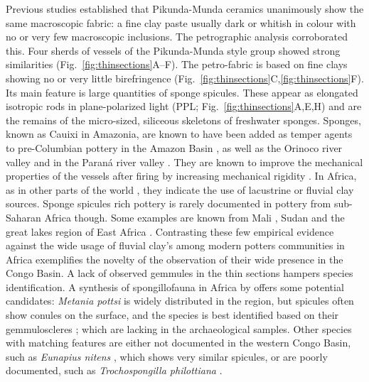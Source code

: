 \documentclass[smallextended,natbib]{svjour3}       %
\begin{document}
Previous studies \citet[60--69]{Seidensticker.2021e} established that Pikunda-Munda ceramics unanimously show the same macroscopic fabric: a fine clay paste usually dark or whitish in colour with no or very few macroscopic inclusions. The petrographic analysis corroborated this. Four sherds of vessels of the Pikunda-Munda style group showed strong similarities (Fig.~\ref{fig:thinsections}A--F). The petro-fabric is based on fine clays showing no or very little birefringence (Fig.~\ref{fig:thinsections}C,\ref{fig:thinsections}F). Its main feature is large quantities of sponge spicules. These appear as elongated isotropic rods in plane-polarized light (PPL; Fig.~\ref{fig:thinsections}A,E,H) and are the remains of the micro-sized, siliceous skeletons of freshwater sponges. Sponges, known as Cauixi in Amazonia, are known to have been added as temper agents to pre-Columbian pottery in the Amazon Basin \citep{Linne.1932,Linne.1957,Costa.2004,Rodrigues.2017,Villagran.2022}, as well as the Orinoco river valley \citep{LozadaMendieta.2019} and in the Paraná river valley \citep{Ottalagano.2016}. They are known to improve the mechanical properties of the vessels after firing by increasing mechanical rigidity \citep{Natalio.2015}. In Africa, as in other parts of the world \citep{Cordell.1993,Bloch.2019}, they indicate the use of lacustrine or fluvial clay sources. Sponge spicules rich pottery is rarely documented in pottery from sub-Saharan Africa though. Some examples are known from Mali \citep{Brissaud.1986,Mcintosh.1989,Nixon.2017}, Sudan \citep{Adamson.1987} and the great lakes region of East Africa \citep[185]{Ashley.2005}. Contrasting these few empirical evidence against the wide usage of fluvial clay's among modern potters communities in Africa \citep[19 Map~1]{Drost.1967} exemplifies the novelty of the observation of their wide presence in the Congo Basin. A lack of observed gemmules in the thin sections hampers species identification. A synthesis of spongillofauna in Africa by \citet{Manconi.2009} offers some potential candidates: \textit{Metania pottsi} is widely distributed in the region, but spicules often show conules on the surface, and the species is best identified based on their gemmuloscleres \citep[38--47]{Manconi.2009}; which are lacking in the archaeological samples. Other species with matching features are either not documented in the western Congo Basin, such as \textit{Eunapius nitens} \citep[149--151]{Manconi.2009}, which shows very similar spicules, or are poorly documented, such as \textit{Trochospongilla philottiana} \citep[198--199]{Manconi.2009}. 
\end{document}
